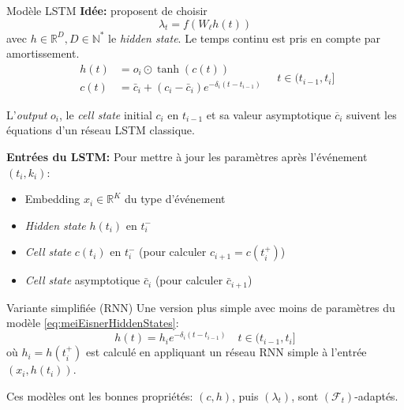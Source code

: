 \documentclass{beamer}
\newcommand{\RR}{\mathbb{R}}
\newcommand{\NN}{\mathbb{N}}
\begin{document}
\begin{frame}{Modèle LSTM \autocite{meiEisnerNeuralHawkes}}
\textbf{Idée:} \citeauthor{meiEisnerNeuralHawkes} proposent de choisir 
\begin{equation}
\lambda_t = f(W_\ell h(t))
\end{equation}
avec $h\in\RR^D, D\in\NN^*$ le \textit{hidden state}. Le temps continu est pris en compte par amortissement.
\begin{equation}\label{eq:meiEisnerHiddenStates}
\begin{aligned}
	h(t) &= o_i \odot \tanh(c(t)) \\
	c(t) &= \bar{c}_i + (c_i - \bar{c}_i)e^{-\delta_i(t - t_{i-1})}
\end{aligned} \quad t\in(t_{i-1}, t_i]
\end{equation}
\end{frame}

\begin{frame}
L'\textit{output} $o_i$, le \textit{cell state} initial $c_i$ en $t_{i-1}$ et sa valeur asymptotique $\overline{c}_i$ suivent les équations d'un réseau LSTM classique.

\textbf{Entrées du LSTM:} Pour mettre à jour les paramètres après l'événement $(t_i,k_i)$:\begin{itemize}
	\item[\textbullet] Embedding $x_i\in\RR^K$ du type d'événement
	\item[\textbullet] \textit{Hidden state} $h(t_{i})$ en $t_{i}^{-}$
	\item[\textbullet] \textit{Cell state} $c(t_{i})$ en $t_i^{-}$ (pour calculer $c_{i+1} = c(t_i^{+})$)
	\item[\textbullet] \textit{Cell state} asymptotique $\bar{c}_i$ (pour calculer $\bar{c}_{i+1}$)
\end{itemize}
\end{frame}


\begin{frame}{Variante simplifiée (RNN)}
Une version plus simple avec moins de paramètres du modèle \eqref{eq:meiEisnerHiddenStates}:
\begin{equation}
	h(t) = h_i e^{-\delta_i (t - t_{i-1})}
	\quad t\in (t_{i-1}, t_i]
\end{equation}
où $h_i = h(t_i^{+})$ est calculé en appliquant un réseau RNN simple à l'entrée $(x_i, h(t_i))$.

\end{frame}

\begin{frame}
Ces modèles ont les bonnes propriétés: $(c,h)$, puis $(\lambda_t)$, sont $(\mathcal{F}_t)$-adaptés.
\end{frame}
\end{document}
